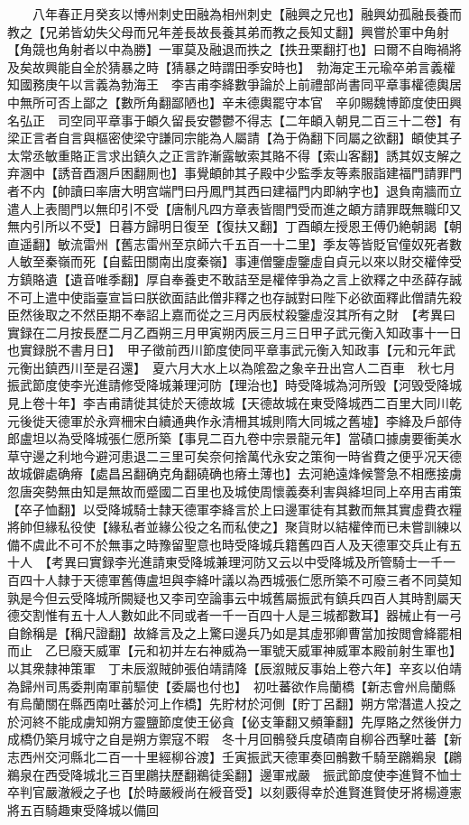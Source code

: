 　　八年春正月癸亥以博州刺史田融為相州刺史【融興之兄也】融興幼孤融長養而教之【兄弟皆幼失父母而兄年差長故長養其弟而教之長知丈翻】興嘗於軍中角射【角競也角射者以中為勝】一軍莫及融退而抶之【抶丑栗翻打也】曰爾不自晦禍將及矣故興能自全於猜暴之時【猜暴之時謂田季安時也】　勃海定王元瑜卒弟言義權知國務庚午以言義為勃海王　李吉甫李絳數爭論於上前禮部尚書同平章事權德輿居中無所可否上鄙之【數所角翻鄙陋也】辛未德輿罷守本官　辛卯賜魏博節度使田興名弘正　司空同平章事于頔久留長安鬱鬱不得志【二年頔入朝見二百三十二卷】有梁正言者自言與樞密使梁守謙同宗能為人屬請【為于偽翻下同屬之欲翻】頔使其子太常丞敏重賂正言求出鎮久之正言詐漸露敏索其賂不得【索山客翻】誘其奴支解之弃溷中【誘音酉溷戶困翻厠也】事覺頔帥其子殿中少監季友等素服詣建福門請罪門者不内【帥讀曰率唐大明宫端門曰丹鳳門其西曰建福門内即納字也】退負南牆而立遣人上表閤門以無印引不受【唐制凡四方章表皆閤門受而進之頔方請罪既無職印又無内引所以不受】日暮方歸明日復至【復扶又翻】丁酉頔左授恩王傅仍絶朝謁【朝直遥翻】敏流雷州【舊志雷州至京師六千五百一十二里】季友等皆貶官僮奴死者數人敏至秦嶺而死【自藍田關南出度秦嶺】事連僧鑒虛鑒虛自貞元以來以財交權倖受方鎮賂遺【遺音唯季翻】厚自奉養吏不敢詰至是權倖爭為之言上欲釋之中丞薛存誠不可上遣中使詣臺宣旨曰朕欲面詰此僧非釋之也存誠對曰陛下必欲面釋此僧請先殺臣然後取之不然臣期不奉詔上嘉而從之三月丙辰杖殺鑒虛沒其所有之財　【考異曰實録在二月按長歷二月乙酉朔三月甲寅朔丙辰三月三日甲子武元衡入知政事十一日也實録脱不書月日】　甲子徵前西川節度使同平章事武元衡入知政事【元和元年武元衡出鎮西川至是召還】　夏六月大水上以為隂盈之象辛丑出宫人二百車　秋七月振武節度使李光進請修受降城兼理河防【理治也】時受降城為河所毁【河毁受降城見上卷十年】李吉甫請徙其徒於天德故城【天德故城在東受降城西二百里大同川乾元後徙天德軍於永齊柵宋白續通典作永清柵其城則隋大同城之舊墟】李絳及戶部侍郎盧坦以為受降城張仁愿所築【事見二百九卷中宗景龍元年】當磧口據虜要衝美水草守邊之利地今避河患退二三里可矣奈何捨萬代永安之策徇一時省費之便乎况天德故城僻處确瘠【處昌呂翻确克角翻磽确也瘠土薄也】去河絶遠烽候警急不相應接虜忽唐突勢無由知是無故而蹙國二百里也及城使周懷義奏利害與絳坦同上卒用吉甫策【卒子恤翻】以受降城騎士隸天德軍李絳言於上曰邊軍徒有其數而無其實虛費衣糧將帥但緣私役使【緣私者並緣公役之名而私使之】聚貨財以結權倖而已未嘗訓練以備不虞此不可不於無事之時豫留聖意也時受降城兵籍舊四百人及天德軍交兵止有五十人　【考異曰實録李光進請東受降城兼理河防又云以中受降城及所管騎士一千一百四十人隸于天德軍舊傳盧坦與李絳叶議以為西城張仁愿所築不可廢三者不同莫知孰是今但云受降城所闕疑也又李司空論事云中城舊屬振武有鎮兵四百人其時割屬天德交割惟有五十人人數如此不同或者一千一百四十人是三城都數耳】器械止有一弓自餘稱是【稱尺證翻】故絳言及之上驚曰邊兵乃如是其虛邪卿曹當加按閲會絳罷相而止　乙巳廢天威軍【元和初并左右神威為一軍號天威軍神威軍本殿前射生軍也】以其衆隸神策軍　丁未辰溆賊帥張伯靖請降【辰溆賊反事始上卷六年】辛亥以伯靖為歸州司馬委荆南軍前驅使【委屬也付也】　初吐蕃欲作烏蘭橋【新志會州烏蘭縣有烏蘭關在縣西南吐蕃於河上作橋】先貯材於河側【貯丁呂翻】朔方常潛遣人投之於河終不能成虜知朔方靈鹽節度使王佖貪【佖支筆翻又頻筆翻】先厚賂之然後併力成橋仍築月城守之自是朔方禦寇不暇　冬十月回鶻發兵度磧南自柳谷西擊吐蕃【新志西州交河縣北二百一十里經柳谷渡】壬寅振武天德軍奏回鶻數千騎至鸊鵜泉【鸊鵜泉在西受降城北三百里鸊扶歷翻鵜徒奚翻】邊軍戒嚴　振武節度使李進賢不恤士卒判官嚴澈綬之子也【於時嚴綬尚在綬音受】以刻覈得幸於進賢進賢使牙將楊遵憲將五百騎趣東受降城以備回